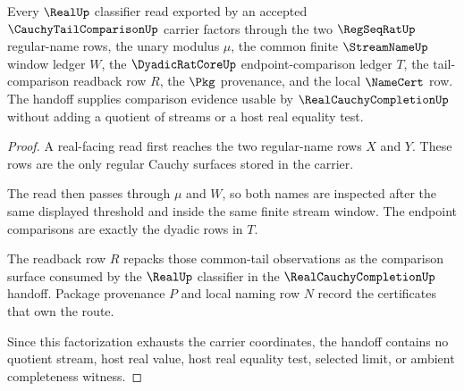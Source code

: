\begin{theorem}
\label{thm:cauchy-tail-comparison-real-completion-handoff}
Every $\RealUp$ classifier read exported by an accepted $\CauchyTailComparisonUp$ carrier factors through the two $\RegSeqRatUp$ regular-name rows, the unary modulus $\mu$, the common finite $\StreamNameUp$ window ledger $W$, the $\DyadicRatCoreUp$ endpoint-comparison ledger $T$, the tail-comparison readback row $R$, the $\Pkg$ provenance, and the local $\NameCert$ row. The handoff supplies comparison evidence usable by $\RealCauchyCompletionUp$ without adding a quotient of streams or a host real equality test.
\end{theorem}
\begin{proof}
A real-facing read first reaches the two regular-name rows $X$ and $Y$. These rows are the only regular Cauchy surfaces stored in the carrier.

The read then passes through $\mu$ and $W$, so both names are inspected after the same displayed threshold and inside the same finite stream window. The endpoint comparisons are exactly the dyadic rows in $T$.

The readback row $R$ repacks those common-tail observations as the comparison surface consumed by the $\RealUp$ classifier in the $\RealCauchyCompletionUp$ handoff. Package provenance $P$ and local naming row $N$ record the certificates that own the route.

Since this factorization exhausts the carrier coordinates, the handoff contains no quotient stream, host real value, host real equality test, selected limit, or ambient completeness witness.
\end{proof}

